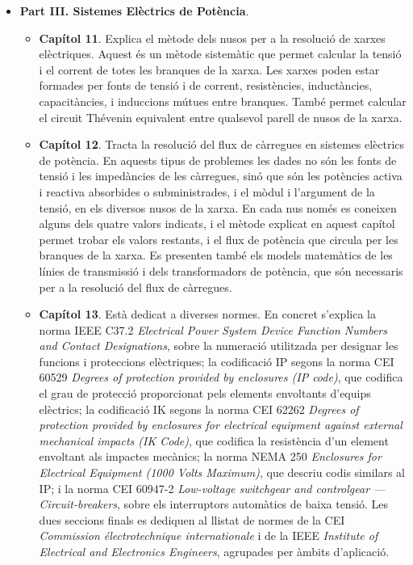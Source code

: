 \begin{itemize}
\begin{itemize}
		\end{itemize}
		\item \textbf{Part III. Sistemes Elèctrics de Potència}. 
		\begin{itemize}
			\item \textbf{Capítol 11}. Explica el mètode dels nusos per a la resolució de xarxes elèctriques. Aquest és un mètode sistemàtic que permet calcular la tensió i el corrent de totes les branques de la xarxa. Les xarxes poden estar  formades per fonts de tensió i de corrent, resistències, inductàncies, capacitàncies, i induccions mútues entre branques. També permet calcular el circuit Thévenin equivalent entre qualsevol parell de nusos de la xarxa.
			\item \textbf{Capítol 12}. Tracta la resolució del  flux de càrregues en sistemes 	elèctrics de potència. En aquests tipus de problemes les dades no són les fonts de tensió i les impedàncies de les càrregues, sinó que són les potències activa i reactiva absorbides o subministrades, i el mòdul i l'argument de la tensió, en els diversos nusos de la xarxa. En cada nus només es coneixen alguns dels quatre valors indicats, i el mètode explicat en aquest capítol permet trobar els valors restants, i el flux de potència que circula per les branques de la xarxa. Es presenten també els models matemàtics de les línies de transmissió i dels transformadors de potència, que són necessaris per a la resolució del flux de càrregues.
			\item \textbf{Capítol 13}. Està dedicat a  diverses normes. En concret s'explica la norma IEEE C37.2 \textit{Electrical Power System Device Function Numbers and Contact Designations}, sobre la numeració utilitzada per designar les funcions i proteccions elèctriques; la codificació IP segons la norma CEI 60529 \textit{Degrees of protection provided by enclosures (IP code)}, que codifica el grau de protecció proporcionat pels 			elements envoltants d’equips elèctrics; la codificació IK segons  la norma CEI 62262 \textit{Degrees of protection provided by enclosures for 			electrical equipment against external mechanical impacts (IK Code)}, que  codifica la resistència d’un
			element envoltant als impactes mecànics; la norma
			NEMA 250 \textit{Enclosures for Electrical Equipment (1000 Volts Maximum)}, que descriu codis similars al IP; i la norma CEI 60947-2 \textit{Low-voltage switchgear and controlgear --- Circuit-breakers}, sobre els interruptors automàtics de baixa tensió. Les dues seccions finals es dediquen al llistat de normes de la CEI \textit{Commission électrotechnique internationale} i de la IEEE \textit{Institute of Electrical and Electronics Engineers}, agrupades per àmbits d'aplicació.

\end{itemize}
\end{itemize}
